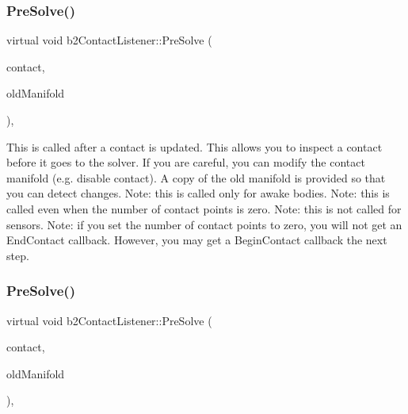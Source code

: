 \subsubsection{\texorpdfstring{Pre\+Solve()}{PreSolve()}\hspace{0.1cm}{\footnotesize\ttfamily [1/2]}}
{\footnotesize\ttfamily virtual void b2\+Contact\+Listener\+::\+Pre\+Solve (\begin{DoxyParamCaption}\item[{\hyperlink{classb2Contact}{b2\+Contact} $\ast$}]{contact,  }\item[{const \hyperlink{structb2Manifold}{b2\+Manifold} $\ast$}]{old\+Manifold }\end{DoxyParamCaption})\hspace{0.3cm}{\ttfamily [inline]}, {\ttfamily [virtual]}}

This is called after a contact is updated. This allows you to inspect a contact before it goes to the solver. If you are careful, you can modify the contact manifold (e.\+g. disable contact). A copy of the old manifold is provided so that you can detect changes. Note\+: this is called only for awake bodies. Note\+: this is called even when the number of contact points is zero. Note\+: this is not called for sensors. Note\+: if you set the number of contact points to zero, you will not get an End\+Contact callback. However, you may get a Begin\+Contact callback the next step. \mbox{\label{classb2ContactListener_a416f85eb45a1099053402b15a19a7de0}} 
\subsubsection{\texorpdfstring{Pre\+Solve()}{PreSolve()}\hspace{0.1cm}{\footnotesize\ttfamily [2/2]}}
{\footnotesize\ttfamily virtual void b2\+Contact\+Listener\+::\+Pre\+Solve (\begin{DoxyParamCaption}\item[{\hyperlink{classb2Contact}{b2\+Contact} $\ast$}]{contact,  }\item[{const \hyperlink{structb2Manifold}{b2\+Manifold} $\ast$}]{old\+Manifold }\end{DoxyParamCaption})\hspace{0.3cm}{\ttfamily [inline]}, {\ttfamily [virtual]}}

